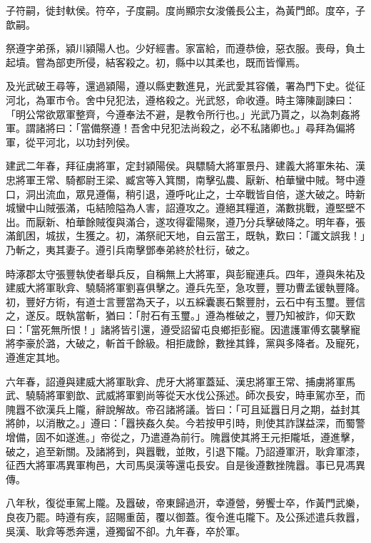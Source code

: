 \begin{pinyinscope}
子符嗣，徙封軑侯。符卒，子度嗣。度尚顯宗女浚儀長公主，為黃門郎。度卒，子歆嗣。

祭遵字弟孫，潁川潁陽人也。少好經書。家富給，而遵恭儉，惡衣服。喪母，負土起墳。嘗為部吏所侵，結客殺之。初，縣中以其柔也，既而皆憚焉。

及光武破王尋等，還過潁陽，遵以縣吏數進見，光武愛其容儀，署為門下史。從征河北，為軍市令。舍中兒犯法，遵格殺之。光武怒，命收遵。時主簿陳副諫曰：「明公常欲眾軍整齊，今遵奉法不避，是教令所行也。」光武乃貰之，以為刺姦將軍。謂諸將曰：「當備祭遵！吾舍中兒犯法尚殺之，必不私諸卿也。」尋拜為偏將軍，從平河北，以功封列侯。

建武二年春，拜征虜將軍，定封潁陽侯。與驃騎大將軍景丹、建義大將軍朱祐、漢忠將軍王常、騎都尉王梁、臧宮等入箕關，南擊弘農、厭新、柏華蠻中賊。弩中遵口，洞出流血，眾見遵傷，稍引退，遵呼叱止之，士卒戰皆自倍，遂大破之。時新城蠻中山賊張滿，屯結險隘為人害，詔遵攻之。遵絕其糧道，滿數挑戰，遵堅壁不出。而厭新、柏華餘賊復與滿合，遂攻得霍陽聚，遵乃分兵擊破降之。明年春，張滿飢困，城拔，生獲之。初，滿祭祀天地，自云當王，既執，歎曰：「讖文誤我！」乃斬之，夷其妻子。遵引兵南擊鄧奉弟終於杜衍，破之。

時涿郡太守張豐執使者舉兵反，自稱無上大將軍，與彭寵連兵。四年，遵與朱祐及建威大將軍耿弇、驍騎將軍劉喜俱擊之。遵兵先至，急攻豐，豐功曹孟锾執豐降。初，豐好方術，有道士言豐當為天子，以五綵囊裹石繫豐肘，云石中有玉璽。豐信之，遂反。既執當斬，猶曰：「肘石有玉璽。」遵為椎破之，豐乃知被詐，仰天歎曰：「當死無所恨！」諸將皆引還，遵受詔留屯良鄉拒彭寵。因遣護軍傅玄襲擊寵將李豪於潞，大破之，斬首千餘級。相拒歲餘，數挫其鋒，黨與多降者。及寵死，遵進定其地。

六年春，詔遵與建威大將軍耿弇、虎牙大將軍蓋延、漢忠將軍王常、捕虜將軍馬武、驍騎將軍劉歆、武威將軍劉尚等從天水伐公孫述。師次長安，時車駕亦至，而隗囂不欲漢兵上隴，辭說解故。帝召諸將議。皆曰：「可且延囂日月之期，益封其將帥，以消散之。」遵曰：「囂挾姦久矣。今若按甲引時，則使其詐謀益深，而蜀警增備，固不如遂進。」帝從之，乃遣遵為前行。隗囂使其將王元拒隴坻，遵進擊，破之，追至新關。及諸將到，與囂戰，並敗，引退下隴。乃詔遵軍汧，耿弇軍漆，征西大將軍馮異軍栒邑，大司馬吳漢等還屯長安。自是後遵數挫隗囂。事已見馮異傳。

八年秋，復從車駕上隴。及囂破，帝東歸過汧，幸遵營，勞饗士卒，作黃門武樂，良夜乃罷。時遵有疾，詔賜重茵，覆以御蓋。復令進屯隴下。及公孫述遣兵救囂，吳漢、耿弇等悉奔還，遵獨留不卻。九年春，卒於軍。


\end{pinyinscope}
